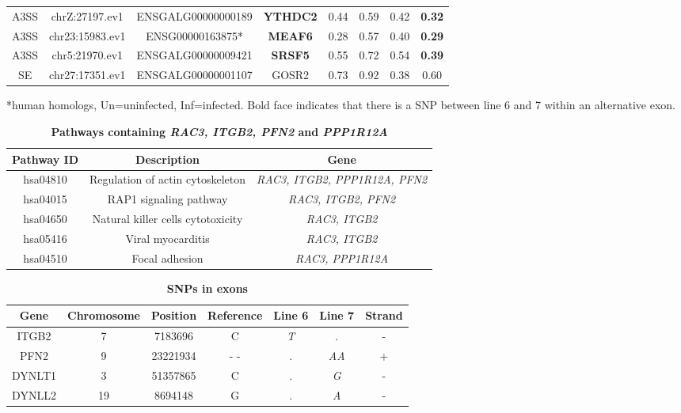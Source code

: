 \documentclass[10pt]{article}
\begin{document}
\begin{table}[!ht]
\begin{tabular}{cccccccc}
A3SS & chrZ:27197.ev1 & ENSGALG00000000189 & \textbf{YTHDC2} & 0.44 & 0.59 & 0.42 & \textbf{0.32} \\
A3SS & chr23:15983.ev1 & ENSG00000163875* & \textbf{MEAF6} & 0.28 & 0.57 & 0.40 & \textbf{0.29} \\
A3SS & chr5:21970.ev1 & ENSGALG00000009421 & \textbf{SRSF5} & 0.55 & 0.72 & 0.54 & \textbf{0.39} \\
\hline
SE & chr27:17351.ev1 & ENSGALG00000001107 & GOSR2 & 0.73 & 0.92 & 0.38 & 0.60 \\
\hline
\end{tabular}
\begin{flushleft}
    *human homologs, Un=uninfected, Inf=infected.
    Bold face indicates that there is a SNP between line 6 and 7 within an alternative exon.
\end{flushleft}
\label{tab:line67i_diff_line67u_three}
\end{table}

\begin{table}[!ht]
\caption{
\bf{Pathways containing \textit{RAC3, ITGB2, PFN2} and \textit{PPP1R12A}}}
\begin{tabular}{ccc}
\hline
Pathway ID &  Description & Gene \\
\hline
hsa04810 & Regulation of actin cytoskeleton & \textit{RAC3, ITGB2, PPP1R12A, PFN2} \\
hsa04015 & RAP1 signaling pathway & \textit{RAC3, ITGB2, PFN2} \\
hsa04650 & Natural killer cells cytotoxicity & \textit{RAC3, ITGB2} \\
hsa05416 & Viral myocarditis & \textit{RAC3, ITGB2} \\
hsa04510 & Focal adhesion & \textit{RAC3, PPP1R12A} \\
\hline
\end{tabular}
\begin{flushleft}
\end{flushleft}
\label{tab:integrin}
\end{table}

\begin{table}[!ht]
\caption{
\bf{SNPs in exons}}
\begin{tabular}{ccccccc}
\hline
Gene &  Chromosome & Position & Reference & Line 6 & Line 7 & Strand \\
\hline
ITGB2 & 7 & 7183696 & C & \textit{T} & . & - \\
PFN2 & 9 & 23221934 & -  - & . & \textit{AA} & + \\
DYNLT1 & 3 & 51357865 & C & . & \textit{G} & - \\
DYNLL2 & 19 & 8694148 & G & . & \textit{A} & - \\
\hline
\end{tabular}
\begin{flushleft}
\end{flushleft}
\label{tab:deu_snps}
\end{table}
\end{document}
